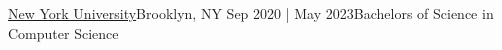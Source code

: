 \resumeSubheadingEdu
{\href{https://engineering.nyu.edu}{New York University}}{Brooklyn, NY}
{Sep 2020 | May 2023}{Bachelors of Science in Computer Science}
